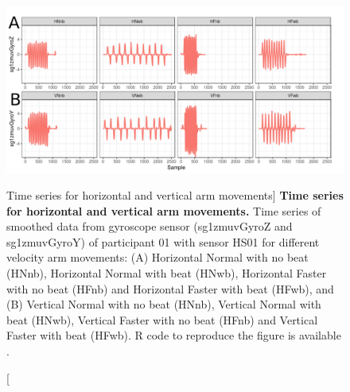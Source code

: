 \begin{figure}
  \centering
  \includegraphics[width=1.0\textwidth]{hii-sts}
    \caption
	[Time series for horizontal and vertical arm movements]{
	{\bf Time series for horizontal and vertical arm movements.} 
		Time series of smoothed data from gyroscope sensor 
		(sg1zmuvGyroZ and sg1zmuvGyroY) of participant 01 
		with sensor HS01 for different velocity arm movements: 
		(A) Horizontal Normal with no beat (HNnb),
			Horizontal Normal with beat (HNwb), 
			Horizontal Faster with no beat (HFnb) and
			Horizontal Faster with beat (HFwb), and 
		(B) Vertical Normal with no beat (HNnb),
			Vertical Normal with beat (HNwb), 
			Vertical Faster with no beat (HFnb) and
			Vertical Faster with beat (HFwb).
		R code to reproduce the figure is available \cite{hwum2018}.
        }
	\label{fig:hii-sts}
\end{figure}






